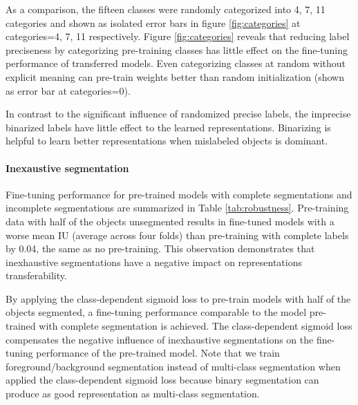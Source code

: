 As a comparison, the fifteen classes were randomly categorized into 4, 7, 11 categories and shown as isolated error bars in figure \ref{fig:categories} at categories=4, 7, 11 respectively.
Figure \ref{fig:categories} reveals that reducing label preciseness by categorizing pre-training classes has little effect on the fine-tuning performance of transferred models.
Even categorizing classes at random without explicit meaning can pre-train weights better than random initialization (shown as error bar at categories=0).

In contrast to the significant influence of randomized precise labels, the imprecise binarized labels have little effect to the learned representations.
Binarizing is helpful to learn better representations when mislabeled objects is dominant.

\paragraph{Inexaustive segmentation}
Fine-tuning performance for pre-trained models with complete segmentations and incomplete segmentations are summarized in Table \ref{tab:robustness}.
Pre-training data with half of the objects unsegmented results in fine-tuned models with a worse mean IU (average across four folds) than pre-training with complete labels by 0.04, the same as no pre-training.
This observation demonstrates that inexhaustive segmentations have a negative impact on representations transferability.

By applying the class-dependent sigmoid loss to pre-train models with half of the objects segmented, a fine-tuning performance comparable to the model pre-trained with complete segmentation is achieved.
The class-dependent sigmoid loss compensates the negative influence of inexhaustive segmentations on the fine-tuning performance of the pre-trained model.
Note that we train foreground/background segmentation instead of multi-class segmentation when applied the class-dependent sigmoid loss because binary segmentation can produce as good representation as multi-class segmentation.


